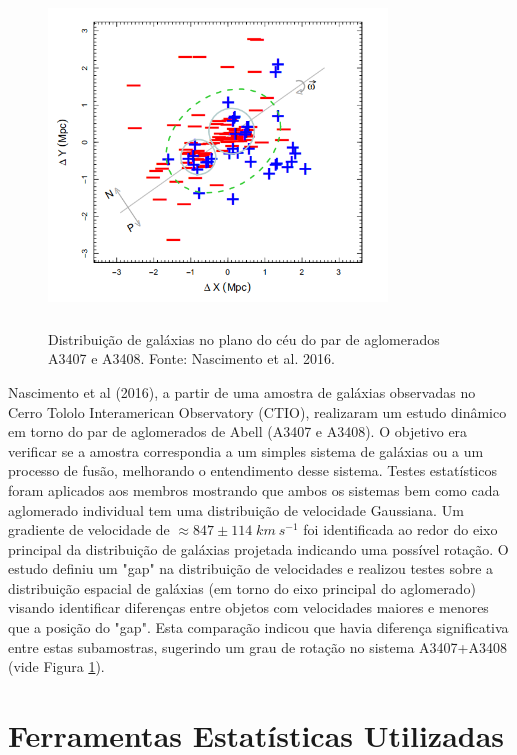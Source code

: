 \begin{figure}[!htbp] %
\vspace{-2pt}
\begin{center}
\includegraphics[height=9cm,width=9cm]{04-figuras/nascimento.png}%
\caption{Distribuição de galáxias no plano do céu do par de aglomerados A3407 e A3408. Fonte: Nascimento et al. 2016.}
\label{fig3}%
\end{center}
\end{figure}

Nascimento et al (2016), a partir de uma amostra de galáxias observadas no Cerro Tololo Interamerican Observatory (CTIO), realizaram um estudo dinâmico em torno do par de aglomerados de Abell (A3407 e A3408). O objetivo era verificar se a amostra correspondia a um simples sistema de galáxias ou a um processo de fusão, melhorando o entendimento desse sistema. Testes estatísticos foram aplicados aos membros mostrando que ambos os sistemas bem como cada aglomerado individual tem uma distribuição de velocidade Gaussiana. Um gradiente de velocidade de $\approx 847 \pm 114\; {km~s^{-1}}$ foi identificada ao redor do eixo principal da distribuição de galáxias projetada indicando uma possível rotação. 
O estudo definiu um "gap" na distribuição de velocidades e realizou testes sobre a distribuição espacial de galáxias (em torno do eixo principal do aglomerado) visando identificar diferenças entre objetos com velocidades maiores e menores que a posição do "gap". Esta comparação indicou que havia diferença significativa entre estas subamostras, sugerindo um grau de rotação no sistema A3407+A3408 (vide Figura \ref{fig3}).

\chapter{Ferramentas Estatísticas Utilizadas}
